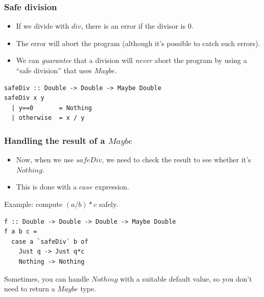 \documentclass{beamer}
\begin{document}
\begin{frame}[fragile]
\frametitle{Safe division}

\begin{itemize}
\item If we divide with $div$, there is an error if the divisor is 0.
\item The error will abort the program (although it's possible to
  catch such errors).
\item We can \emph{guarantee} that a division will \emph{never}
  abort the program by using a ``safe division'' that uses $Maybe$.
\end{itemize}

\begin{verbatim}
safeDiv :: Double -> Double -> Maybe Double
safeDiv x y
  | y==0       = Nothing
  | otherwise  = x / y
\end{verbatim}

\end{frame}

\begin{frame}[fragile]
\frametitle{Handling the result of a $Maybe$}

\begin{itemize}
\item Now, when we use $safeDiv$, we need to check the result to
  see whether it's $Nothing$.
\item This is done with a $case$ expression.
\end{itemize}

Example: compute $(a/b)*c$ safely.

\begin{verbatim}
f :: Double -> Double -> Double -> Maybe Double
f a b c =
  case a `safeDiv` b of
    Just q -> Just q*c
    Nothing -> Nothing
  \end{verbatim}

Sometimes, you can handle $Nothing$ with a suitable default value,
so you don't need to return a $Maybe$ type.

\end{frame}
\end{document}
